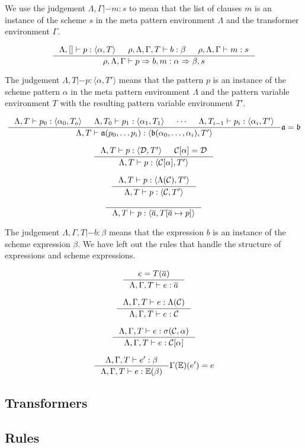 We use the judgement $\Lambda, \Gamma |- m : s$ to mean that the list of clauses $m$ is
an instance of the scheme $s$ in the meta pattern environment $\Lambda$ and the
transformer environment $\Gamma$.

\[
\inference{\Lambda, [] |- p : \langle \alpha, T \rangle &
  \rho, \Lambda, \Gamma, T |- b : \beta &
\rho, \Lambda, \Gamma |- m : s}
{\rho, \Lambda, \Gamma |- p => b, m : \alpha => \beta, s}
\]

The judgement $\Lambda, T |- p : \langle \alpha, T' \rangle$ means that the
pattern $p$ is an instance of the scheme pattern $\alpha$ in the meta pattern
environment $\Lambda$ and the pattern variable environment $T$ with the
resulting pattern variable environment $T'$.

\[
\inference{\Lambda, T |- p_0 : \langle \alpha_0, T_o \rangle &
\Lambda, T_0 |- p_1 : \langle \alpha_1, T_1 \rangle &
\cdots &
\Lambda, T_{i-1} |- p_i : \langle \alpha_i, T' \rangle
}
{\Lambda, T |- \mathfrak{a}(p_0, \ldots p_i) : \langle \mathfrak{b}(\alpha_0,
  \ldots, \alpha_i), T' \rangle}
{\mathfrak{a} = \mathfrak{b}}
\]

\[
\inference
{
  \Lambda, T |- p : \langle \mathcal{D}, T' \rangle&
  \mathcal{C}[\alpha] = \mathcal{D}
}
{
  \Lambda, T |- p : \langle \mathcal{C}[\alpha], T' \rangle
}
\]

\[
\inference
{
  \Lambda, T |- p : \langle \Lambda(\mathcal{C}), T' \rangle
}
{
  \Lambda, T |- p : \langle \mathcal{C}, T' \rangle
}
\]

\[
\inference{}
{\Lambda, T |- p : \langle \overline{a}, T[\overline{a} \mapsto p] \rangle}
\]

The judgement $\Lambda, \Gamma, T |- b : \beta$ means that the expression $b$ is
an instance of the scheme expression $\beta$. We have left out the rules that
handle the structure of expressions and scheme expressions.

\[
\inference{e = T(\overline{a})}
{\Lambda, \Gamma, T |- e : \overline{a}}
\]

\[
\inference{\Lambda, \Gamma, T |- e : \Lambda(\mathcal{C})}
{\Lambda, \Gamma, T |- e : \mathcal{C}}
\]

\[
\inference
{\Lambda, \Gamma, T |- e : \sigma(\mathcal{C}, \alpha)}
{\Lambda, \Gamma, T |- e : \mathcal{C}[\alpha]}
\]

\[
\inference{\Lambda, \Gamma, T |- e' : \beta}
{\Lambda, \Gamma, T |- e : \mathbb{E}(\beta)}{\Gamma(\mathbb{E})(e') = e}
\]

\subsection{Transformers}

\subsection{Rules}





